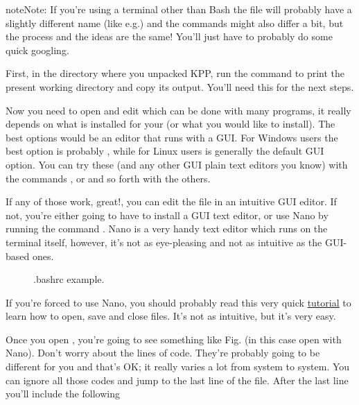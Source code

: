 \documentclass[letterpaper,10pt,openany,oneside]{sphinxmanual}
\begin{document}
\begin{notice}{note}{Note:}
If you're using a terminal other than Bash the  file will probably
have a slightly different name (like  e.g.) and the commands might
also differ a bit, but the process and the ideas are the same! You'll just have
to probably do some quick googling.
\end{notice}

First, in the directory where you unpacked KPP, run the command  to
print the present working directory and copy its output. You'll need this for
the next steps.

Now you need to open and edit  which can be done with many programs,
it really depends on what is installed for your (or what you would like to
install).  The best options would be an editor that runs with a GUI. For
Windows users the best option is probably , while for Linux users
 is generally the default GUI option. You can try these (and any other
GUI plain text editors you know) with the commands , or
 and so forth with the others.

If any of those work, great!, you can edit the file in an intuitive GUI editor.
If not, you're either going to have to install a GUI text editor, or use Nano
by running the command . Nano is a very handy text editor
which runs on the terminal itself, however, it's not as eye-pleasing and not as
intuitive as the GUI-based ones.
\begin{figure}[htbp]
\centering
\capstart

\noindent{}
\caption{.bashrc example.}\label{compiling:nano-ex}\label{compiling:id1}\end{figure}

If you're forced to use Nano, you should probably read this very quick
\href{http://www.howtogeek.com/howto/42980/the-beginners-guide-to-nano-the-linux-command-line-text-editor/}{tutorial}
to learn how to open, save and close files. It's not as intuitive, but it's
very easy.

Once you open , you're going to see something like Fig.
{\hyperref[compiling:nano\string-ex]{}} (in this case open with Nano). Don't worry about the lines of
code. They're probably going to be different for you and that's OK; it really
varies a lot from system to system. You can ignore all those codes and jump to
the last line of the file. After the last line you'll include the following
\end{document}

